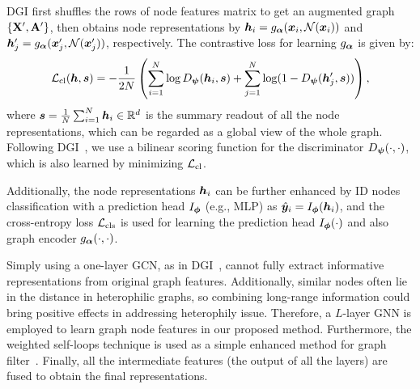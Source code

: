DGI first shuffles the rows of node features matrix to get an augmented graph $\{ \mathbf{X}', \mathbf{A}' \}$, 
then obtains node representations by ${\bm{h}}_i = g_{\bm{\alpha}}( {\bm{x}}_i, \mathcal{N}({\bm{x}}_i) )$ and ${\bm{h}}'_j = g_{\bm{\alpha}}( {\bm{x}}'_j, \mathcal{N}({\bm{x}}'_j) )$, respectively. 
The contrastive loss for learning $g_{{\bm{\alpha}}}$ is given by:
\begin{equation}
\begin{aligned}
\label{eq:cl_obj}
    \mathcal{L}_{\text{cl}}({\bm{h}},\bm{s})  = - \frac{1}{2N} \left( \sum_{i=1}^{N}\log D_{{\bm{\psi}}}({\bm{h}}_i,\bm{s}) + \sum_{j=1}^{N}\log( 1-D_{{\bm{\psi}}}({\bm{h}}'_j,\bm{s}) ) \right),
\end{aligned}
\end{equation}
where $\bm{s} = \frac{1}{N}\sum_{i=1}^{N}{\bm{h}}_i \in \mathbb{R}^{d}$ is the summary readout of all the node representations, 
which can be regarded as a global view of the whole graph. 
Following DGI~\citep{dgi}, we use a bilinear scoring function for the discriminator $D_{{\bm{\psi}}}(\cdot,\cdot)$, which is also learned by minimizing $\mathcal{L}_{\text{cl}}$.


Additionally, the node representations ${\bm{h}}_i$ can be further enhanced by ID nodes classification with a prediction head $I_{{\bm{\phi}}}$ (e.g., MLP) as $\hat{{\bm{y}}}_i = I_{{\bm{\phi}}}({\bm{h}}_i)$, 
and the cross-entropy loss $\mathcal{L}_{\text{cls}}$ is used for learning the prediction head $I_{{\bm{\phi}}}(\cdot)$ and also graph encoder $g_{{\bm{\alpha}}}(\cdot, \cdot)$. 

Simply using a one-layer GCN, as in DGI~\citep{dgi}, cannot fully extract informative representations from original graph features. 
Additionally, similar nodes often lie in the distance in heterophilic graphs, so combining long-range information could bring positive effects in addressing heterophily issue. 
Therefore, a $L$-layer GNN is employed to learn graph node features in our proposed method. 
Furthermore, the weighted self-loops technique is used as a simple enhanced method for graph filter~\citep{fagcn2021,lsgnn}. 
Finally, all the intermediate features (the output of all the layers) are fused to obtain the final representations. 

